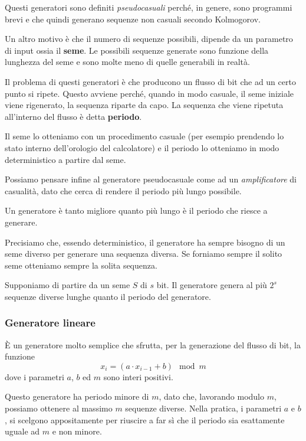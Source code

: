 Questi generatori sono definiti \emph{pseudocasuali} perch\'e, in genere, sono programmi brevi e che quindi generano
sequenze non casuali secondo Kolmogorov.

Un altro motivo \`e che il numero di sequenze possibili, dipende da un parametro di input ossia il \textbf{seme}. Le
possibili sequenze generate sono funzione della lunghezza del seme e sono molte meno di quelle generabili in realt\`a.

Il problema di questi generatori \`e che producono un flusso di bit che ad un certo punto si ripete. Questo avviene
perch\'e, quando in modo casuale, il seme iniziale viene rigenerato, la sequenza riparte da capo. La sequenza che
viene ripetuta all'interno del flusso \`e detta \textbf{periodo}.

Il seme lo otteniamo con un procedimento casuale (per esempio prendendo lo stato interno dell'orologio del calcolatore)
e il periodo lo otteniamo in modo deterministico a partire dal seme.

Possiamo pensare infine al generatore pseudocasuale come ad un \emph{amplificatore} di casualit\`a, dato che cerca di
rendere il periodo pi\`u lungo possibile.

Un generatore \`e tanto migliore quanto pi\`u lungo \`e il periodo che riesce a generare.

Precisiamo che, essendo deterministico, il generatore ha sempre bisogno di un seme diverso per generare una sequenza
diversa. Se forniamo sempre il solito seme otteniamo sempre la solita sequenza.

Supponiamo di partire da un seme $S$ di $s$ bit. Il generatore genera al pi\`u $2^s$ sequenze diverse lunghe quanto il
periodo del generatore.

\subsubsection{Generatore lineare}
\`E un generatore molto semplice che sfrutta, per la generazione del flusso di bit, la funzione
\[ x_i = (a \cdot x_{i - 1} + b) \mod{m} \]
dove i parametri $a$, $b$ ed $m$ sono interi positivi.

Questo generatore ha periodo minore di $m$, dato che, lavorando modulo $m$, possiamo ottenere al massimo $m$ sequenze
diverse. Nella pratica, i parametri $a$ e $b$, si scelgono appositamente per riuscire a far s\`i che il periodo sia
esattamente uguale ad $m$ e non minore.

